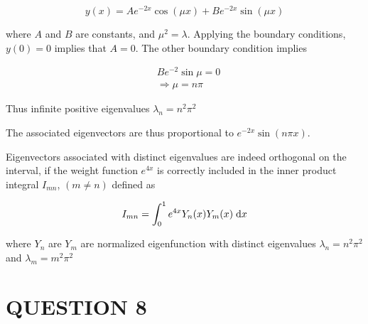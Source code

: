 \documentclass[a4paper]{article}
\begin{document}
\begin{enumerate}
	\[ y(x) = Ae^{-2x} \cos(\mu x) + B e^{-2x} \sin(\mu x) \]
	
	where $ A $ and $ B $ are constants, and $ \mu^{2} = \lambda $. Applying the boundary conditions, $ y(0) = 0 $ implies that $ A = 0 $. The other boundary condition implies

	\begin{align*}
	& B e^{-2} \sin \mu  = 0 \\
	& \Rightarrow \mu = n \pi
	\end{align*}
	
	Thus infinite positive eigenvalues $ \lambda_{n} = n^{2} \pi^{2} $
	
	The associated eigenvectors are thus proportional to $ e^{-2x} \sin (n \pi x) $.
	
	Eigenvectors associated with distinct eigenvalues are indeed orthogonal on the interval, if the weight function $ e^{4x} $ is correctly included in the inner product integral $ I_{mn} $, $ (m \neq n) $ defined as
	
	\[ I_{mn} = \int_{0}^{1} e^{4x} Y_{n}(x)Y_{m}(x) \; \mathrm{d} x \]
	
	where $ Y_{n} $ are $ Y_{m} $ are normalized eigenfunction with distinct eigenvalues $ \lambda_{n} = n^{2} \pi^{2} $ and $ \lambda_{m} = m^{2} \pi^{2} $
	
	
	
	
	
\end{enumerate}



\section{QUESTION 8}
\end{document}
